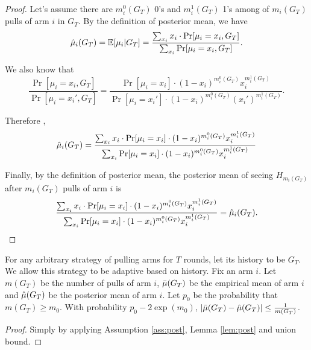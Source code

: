 \begin{proof}
Let's assume there are $m^0_i(G_T)$ 0's and $m^1_i(G_T)$ 1's among of $m_i(G_T)$ pulls of arm $i$ in $G_T$. By the definition of posterior mean, we have
\[
\hat{\mu}_i(G_T) = \mathbb{E}[\mu_i|G_T] = \frac{\sum_{x_i} x_i \cdot \Pr[\mu_i=x_i, G_T]}{\sum_{x_i} \Pr[\mu_i=x_i, G_T]}.
\]

We also know that 
\[
\frac{\Pr[\mu_i = x_i, G_T]}{\Pr[\mu_i = x_i', G_T]} = \frac{\Pr[\mu_i = x_i] \cdot  (1-x_i)^{m^0_i(G_T)}x_i^{m^1_i(G_T)}}{\Pr[\mu_i = x_i'] \cdot (1-x_i)^{m^0_i(G_T)}(x_i')^{m^1_i(G_T)} }.
\]

Therefore ,
\[
\hat{\mu}_i(G_T) = \frac{\sum_{x_i} x_i \cdot \Pr[\mu_i = x_i] \cdot  (1-x_i)^{m^0_i(G_T)}x_i^{m^1_i(G_T)}}{\sum_{x_i}\Pr[\mu_i = x_i] \cdot  (1-x_i)^{m^0_i(G_T)}x_i^{m^1_i(G_T)}}
\]

Finally, by the definition of posterior mean, the posterior mean of seeing $H_{m_i(G_T)}$ after $m_i(G_T)$ pulls of arm $i$ is
\[
\frac{\sum_{x_i} x_i \cdot \Pr[\mu_i = x_i] \cdot  (1-x_i)^{m^0_i(G_T)}x_i^{m^1_i(G_T)}}{\sum_{x_i}\Pr[\mu_i = x_i] \cdot  (1-x_i)^{m^0_i(G_T)}x_i^{m^1_i(G_T)}} = \hat{\mu}_i(G_T).
\]
\end{proof}

\begin{corollary}
\label{cor:post}
For any arbitrary strategy of pulling arms for $T$ rounds, let its history to be $G_T$. We allow this strategy to be adaptive based on history. Fix an arm $i$. Let $m(G_T)$ be the number of pulls of arm $i$, $\bar{\mu}(G_T)$ be the empirical mean of arm $i$ and $\hat{\mu}(G_T)$ be the posterior mean of arm $i$. Let $p_0$ be the probability that $m(G_T) \geq m_0$. With probability $p_0 - 2\exp(m_0)$, $|\bar{\mu}(G_T) - \hat{\mu}(G_T)| \leq \frac{1}{m(G_T)}$.
\end{corollary}

\begin{proof}
Simply by applying Assumption \ref{ass:post}, Lemma \ref{lem:post} and union bound.
\end{proof}
